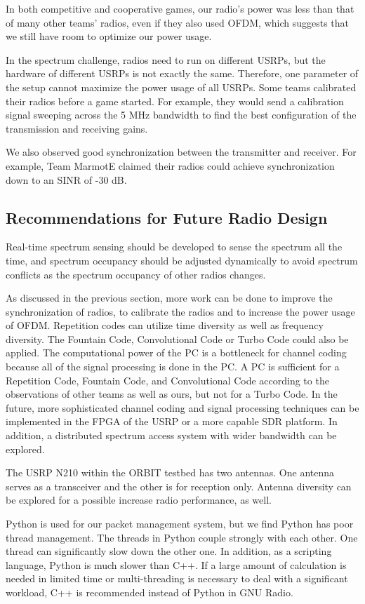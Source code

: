 In both competitive and cooperative games, our radio's power was less than that of many other teams' radios, even if they also used OFDM, which suggests that we still have room to optimize our power usage.

In the spectrum challenge, radios need to run on different USRPs, but the hardware of different USRPs is not exactly the same. Therefore, one parameter of the setup cannot maximize the power usage of all USRPs. Some teams calibrated their radios before a game started. For example, they would send a calibration signal sweeping across the 5 MHz bandwidth to find the best configuration of the transmission and receiving gains.

We also observed good synchronization between the transmitter and receiver. For example, Team MarmotE claimed their radios could achieve synchronization down to an SINR of -30 dB.

\subsection{Recommendations for Future Radio Design}
Real-time spectrum sensing should be developed to sense the spectrum all the time, and spectrum occupancy should be adjusted dynamically to avoid spectrum conflicts as the spectrum occupancy of other radios changes.

As discussed in the previous section, more work can be done to improve the synchronization of radios, to calibrate the radios and to increase the power usage of OFDM. Repetition codes can utilize time diversity as well as frequency diversity. The Fountain Code, Convolutional Code or Turbo Code could also be applied. The computational power of the PC is a bottleneck for channel coding because all of the signal processing is done in the PC. A PC is sufficient for a Repetition Code, Fountain Code, and Convolutional Code according to the observations of other teams as well as ours, but not for a Turbo Code. In the future, more sophisticated channel coding and signal processing techniques can be implemented in the FPGA of the USRP or a more capable SDR platform. In addition, a distributed spectrum access system with wider bandwidth can be explored.

The USRP N210 within the ORBIT testbed has two antennas. One antenna serves as a transceiver and the other is for reception only. Antenna diversity can be explored for a possible increase radio performance, as well.

Python is used for our packet management system, but we find Python has poor thread management. The threads in Python couple strongly with each other. One thread can significantly slow down the other one. In addition, as a scripting language, Python is much slower than C++. If a large amount of calculation is needed in limited time or multi-threading is necessary to deal with a significant workload, C++ is recommended instead of Python in GNU Radio.

